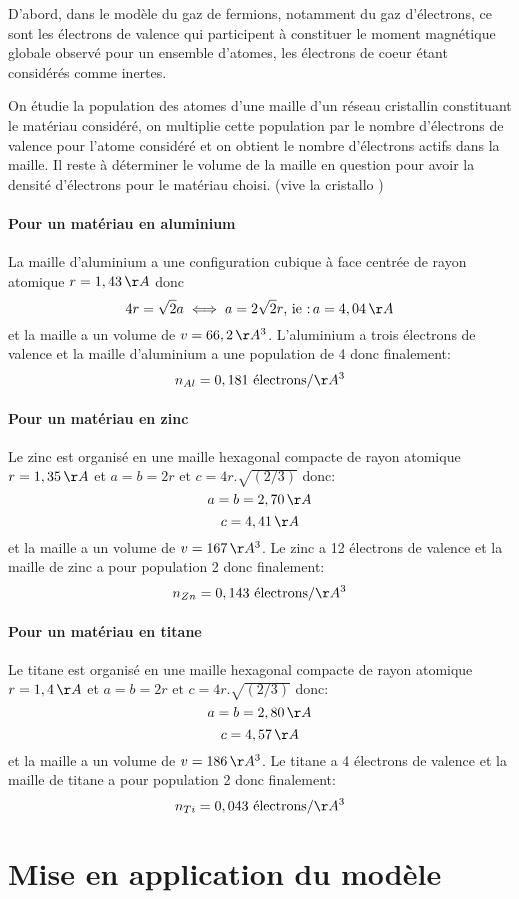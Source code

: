 \documentclass{report}
\begin{document}
D'abord, dans le modèle du gaz de fermions, notamment du gaz d'électrons, ce sont les électrons de valence qui participent à constituer le moment magnétique globale observé pour un ensemble d'atomes, les électrons de coeur étant considérés comme inertes.

On étudie la population des atomes d'une maille d'un réseau cristallin constituant le matériau considéré, on multiplie cette population par le nombre d'électrons de valence pour l'atome considéré et on obtient le nombre d'électrons actifs dans la maille. Il reste à déterminer le volume de la maille en question pour avoir la densité d'électrons pour le matériau choisi. (vive la cristallo \smiley{})
\subsubsection{Pour un matériau en aluminium}

La maille d'aluminium a une configuration cubique à face centrée de rayon atomique $r=1,43\,\AA$ donc $$4r=\sqrt{2}a \iff a = 2\sqrt{2}r \mbox{, ie :} \, a = 4,04\,\AA$$
et la maille a un volume de $v = 66,2 \,\AA^3$. L'aluminium a trois électrons de valence et la maille d'aluminium a une population de 4 donc finalement:
$$n_{Al} = 0,181 \text{ électrons} / \AA^3$$

\subsubsection{Pour un matériau en zinc}
Le zinc est organisé en une maille hexagonal compacte de rayon atomique $r=1,35 \,\AA$ et $a = b = 2r \mbox{ et }c = 4r.\sqrt{(2 / 3)}$ donc:
$$a=b=2,70\,\AA$$
$$c=4,41\,\AA$$
et la maille a un volume de $v = 167\,\AA^3$. Le zinc a 12 électrons de valence et la maille de zinc a pour population 2 donc finalement:
$$n_{Zn} = 0,143 \text{ électrons} / \AA^3$$
\subsubsection{Pour un matériau en titane}
Le titane est organisé en une maille hexagonal compacte de rayon atomique $r=1,4 \,\AA$ et $a = b = 2r \mbox{ et }c = 4r.\sqrt{(2 / 3)}$ donc:
$$a=b=2,80\,\AA$$
$$c=4,57\,\AA$$
et la maille a un volume de $v = 186\,\AA^3$. Le titane a 4 électrons de valence et la maille de titane a pour population 2 donc finalement:
$$n_{Ti} = 0,043 \text{ électrons} / \AA^3$$

\chapter{Mise en application du modèle}
\end{document}
